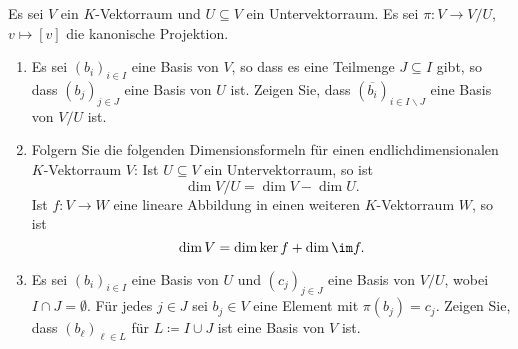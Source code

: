 \begin{question}
  Es sei $V$ ein $K$-Vektorraum und $U \subseteq V$ ein Untervektorraum.
  Es sei $\pi \colon V \to V\!/U$, $v \mapsto [v]$ die kanonische Projektion.
  \begin{enumerate}[leftmargin=*]
    \item
      Es sei $(b_i)_{i \in I}$ eine Basis von $V$, so dass es eine Teilmenge $J \subseteq I$ gibt, so dass $(b_j)_{j \in J}$ eine Basis von $U$ ist.
      Zeigen Sie, dass $(\overline{b_i})_{i \in I \smallsetminus J}$ eine Basis von $V\!/U$ ist.
    \item
      Folgern Sie die folgenden Di\-men\-si\-ons\-for\-meln für einen end\-lich\-di\-men\-si\-o\-na\-len $K$-Vek\-tor\-raum $V$:
      Ist $U \subseteq V$ ein Untervektorraum, so ist
      \[
        \dim V\!/U = \dim V - \dim U.
      \]
      Ist $f \colon V \to W$ eine lineare Abbildung in einen weiteren $K$-Vektorraum $W$, so ist
      \[
        \dim V = \dim \ker f + \dim \im f.
      \]
    \item
      Es sei $(b_i)_{i \in I}$ eine Basis von $U$ und $(c_j)_{j \in J}$ eine Basis von $V\!/U$, wobei $I \cap J = \emptyset$.
      Für jedes $j \in J$ sei $b_j \in V$ eine Element mit $\pi(b_j) = c_j$.
      Zeigen Sie, dass $(b_\ell)_{\ell \in L}$ für $L \coloneqq I \cup J$ ist eine Basis von $V$ ist.
  \end{enumerate}
\end{question}


